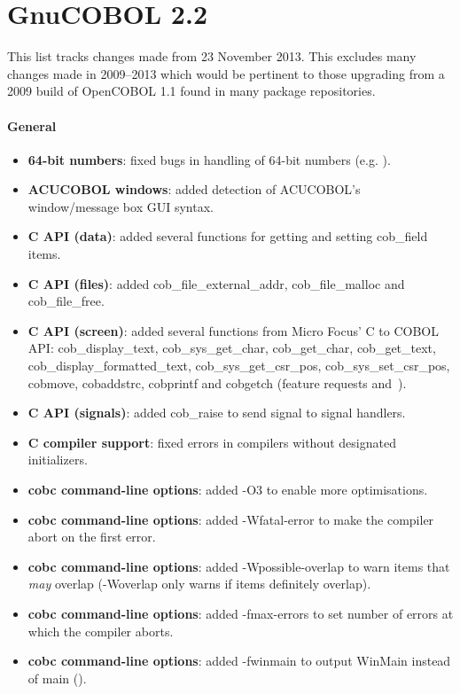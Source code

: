 \section{GnuCOBOL 2.2}

This list tracks changes made from 23 November 2013. This excludes many changes made in 2009--2013 which would be pertinent to those upgrading from a 2009 build of OpenCOBOL 1.1 found in many package repositories.

\paragraph{General}
\begin{itemize}
\item \textbf{64-bit numbers}: fixed bugs in handling of 64-bit numbers (e.g. ).
\item \textbf{ACUCOBOL windows}: added detection of ACUCOBOL's window\slash{}message box GUI syntax.
\item \textbf{C API (data)}: added several functions for getting and setting cob\_field items.
\item \textbf{C API (files)}: added cob\_file\_external\_addr, cob\_file\_malloc and cob\_file\_free.
\item \textbf{C API (screen)}: added several functions from Micro Focus' C to COBOL API: cob\_display\_text, cob\_sys\_get\_char, cob\_get\_char, cob\_get\_text, cob\_display\_formatted\_text, cob\_sys\_get\_csr\_pos, cob\_sys\_set\_csr\_pos, cobmove, cobaddstrc, cobprintf and cobgetch (feature requests  and~).
\item \textbf{C API (signals)}: added cob\_raise to send signal to signal handlers.
\item \textbf{C compiler support}: fixed errors in compilers without designated initializers.
\item \textbf{cobc command-line options}: added -O3 to enable more optimisations.
\item \textbf{cobc command-line options}: added -Wfatal-error to make the compiler abort on the first error.
\item \textbf{cobc command-line options}: added -Wpossible-overlap to warn items that \emph{may} overlap (-Woverlap only warns if items definitely overlap).
\item \textbf{cobc command-line options}: added -fmax-errors to set number of errors at which the compiler aborts.
\item \textbf{cobc command-line options}: added -fwinmain to output WinMain instead of main ().

\end{itemize}
